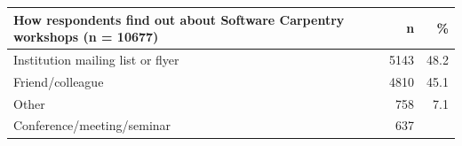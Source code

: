 \documentclass[]{article}
\begin{document}
\begin{longtable}[]{@{}lrr@{}}
\toprule
\begin{minipage}[b]{0.78\columnwidth}\raggedright\strut
How respondents find out about Software Carpentry workshops (n =
10677)\strut
\end{minipage} & \begin{minipage}[b]{0.06\columnwidth}\raggedleft\strut
n\strut
\end{minipage} & \begin{minipage}[b]{0.06\columnwidth}\raggedleft\strut
\%\strut
\end{minipage}\tabularnewline
\midrule
\endhead
\begin{minipage}[t]{0.78\columnwidth}\raggedright\strut
Institution mailing list or flyer\strut
\end{minipage} & \begin{minipage}[t]{0.06\columnwidth}\raggedleft\strut
5143\strut
\end{minipage} & \begin{minipage}[t]{0.06\columnwidth}\raggedleft\strut
48.2\strut
\end{minipage}\tabularnewline
\begin{minipage}[t]{0.78\columnwidth}\raggedright\strut
Friend/colleague\strut
\end{minipage} & \begin{minipage}[t]{0.06\columnwidth}\raggedleft\strut
4810\strut
\end{minipage} & \begin{minipage}[t]{0.06\columnwidth}\raggedleft\strut
45.1\strut
\end{minipage}\tabularnewline
\begin{minipage}[t]{0.78\columnwidth}\raggedright\strut
Other\strut
\end{minipage} & \begin{minipage}[t]{0.06\columnwidth}\raggedleft\strut
758\strut
\end{minipage} & \begin{minipage}[t]{0.06\columnwidth}\raggedleft\strut
7.1\strut
\end{minipage}\tabularnewline
\begin{minipage}[t]{0.78\columnwidth}\raggedright\strut
Conference/meeting/seminar\strut
\end{minipage} & \begin{minipage}[t]{0.06\columnwidth}\raggedleft\strut
637\strut
\end{minipage} & \begin{minipage}[t]{0.06\columnwidth}\raggedleft\strut

\end{minipage}
\end{longtable}
\end{document}

